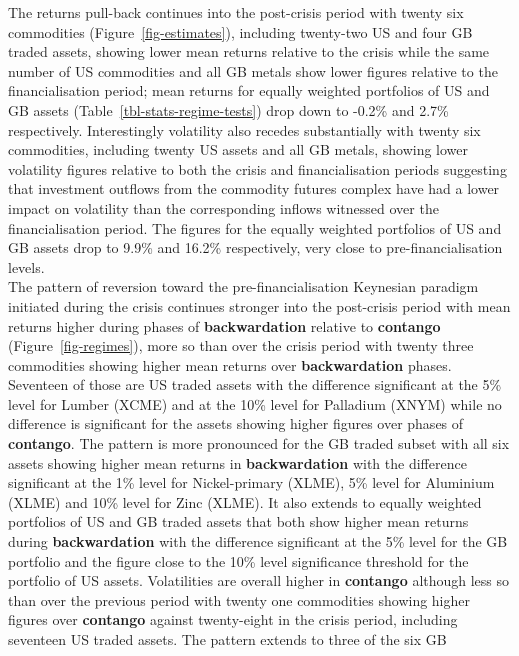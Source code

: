 \documentclass[
  authoryear,
  preprint,
  3p]{elsarticle}
\begin{document}
The returns pull-back continues into the post-crisis period with twenty
six commodities (Figure~\ref{fig-estimates}), including twenty-two US
and four GB traded assets, showing lower mean returns relative to the
crisis while the same number of US commodities and all GB metals show
lower figures relative to the financialisation period; mean returns for
equally weighted portfolios of US and GB assets
(Table~\ref{tbl-stats-regime-tests}) drop down to -0.2\% and 2.7\%
respectively. Interestingly volatility also recedes substantially with
twenty six commodities, including twenty US assets and all GB metals,
showing lower volatility figures relative to both the crisis and
financialisation periods suggesting that investment outflows from the
commodity futures complex have had a lower impact on volatility than the
corresponding inflows witnessed over the financialisation period. The
figures for the equally weighted portfolios of US and GB assets drop to
9.9\% and 16.2\% respectively, very close to pre-financialisation
levels.\\
The pattern of reversion toward the pre-financialisation Keynesian
paradigm initiated during the crisis continues stronger into the
post-crisis period with mean returns higher during phases of
\textbf{backwardation} relative to \textbf{contango}
(Figure~\ref{fig-regimes}), more so than over the crisis period with
twenty three commodities showing higher mean returns over
\textbf{backwardation} phases. Seventeen of those are US traded assets
with the difference significant at the 5\% level for Lumber (XCME) and
at the 10\% level for Palladium (XNYM) while no difference is
significant for the assets showing higher figures over phases of
\textbf{contango}. The pattern is more pronounced for the GB traded
subset with all six assets showing higher mean returns in
\textbf{backwardation} with the difference significant at the 1\% level
for Nickel-primary (XLME), 5\% level for Aluminium (XLME) and 10\% level
for Zinc (XLME). It also extends to equally weighted portfolios of US
and GB traded assets that both show higher mean returns during
\textbf{backwardation} with the difference significant at the 5\% level
for the GB portfolio and the figure close to the 10\% level significance
threshold for the portfolio of US assets. Volatilities are overall
higher in \textbf{contango} although less so than over the previous
period with twenty one commodities showing higher figures over
\textbf{contango} against twenty-eight in the crisis period, including
seventeen US traded assets. The pattern extends to three of the six GB
\end{document}
